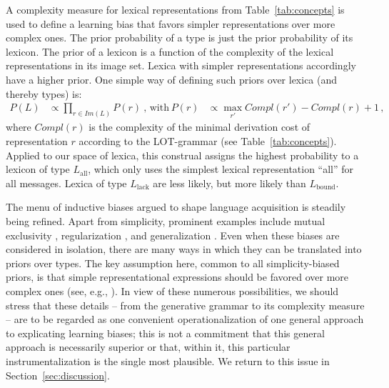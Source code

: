 \documentclass[a4paper, 11pt]{article}
\theoremstyle{Satz}
\newcommand{\mylang}[1]{\ensuremath{L_{\text{#1}}}\xspace} %
\newcommand{\Lall}{\mylang{all}}
\newcommand{\Lbound}{\mylang{bound}}
\newcommand{\Llack}{\mylang{lack}}
\begin{document}
A complexity measure for lexical representations from Table~\ref{tab:concepts} is used to define a
learning bias that favors simpler representations over more complex ones. The prior probability of a
type is just the prior probability of its lexicon. The prior of a lexicon is a function of the
complexity of the lexical representations in its image set. Lexica with simpler representations accordingly have a
higher prior. One simple way of defining such priors over lexica (and thereby types) is:
\begin{align*}
  P(L)  & \propto \prod_{r \in Im(L)} P(r)   \ \text{, with} & 
  P(r) & \propto \max_{r'}Compl(r') - Compl(r) + 1\,,
\end{align*}
where $Compl(r)$ is the complexity of the minimal derivation cost of representation $r$ according to the
LOT-grammar (see Table~\ref{tab:concepts}). Applied to our space of lexica, this construal assigns the highest probability 
to a lexicon of type $\Lall$, which only uses the simplest lexical representation ``all'' for
all messages. Lexica of type $\Llack$ are less likely, but more likely than $\Lbound$. 

The menu of inductive biases argued to shape language acquisition is steadily being
refined. Apart from simplicity, prominent examples include mutual exclusivity
\citep{merriman+bowman:1989,clark:2009}, regularization \citep{hudson+etal:2005}, and
generalization \citep{smith:2011}. Even when these biases are considered in isolation, there
are many ways in which they can be translated into priors over types. The key assumption here,
common to all simplicity-biased priors, is that simple representational expressions should be
favored over more complex ones (see, e.g., \citealt{goodman+etal:2008, piantadosi+etal:2012a,
  kirby+etal:2015}). In view of these numerous possibilities, we should stress that these
details -- from the generative grammar to its complexity measure -- are to be regarded as one
convenient operationalization of one general approach to explicating learning biases; this is
not a commitment that this general approach is necessarily superior or that, within it, this
particular instrumentalization is the single most plausible. We return to this issue in
Section~\ref{sec:discussion}.
\end{document}
